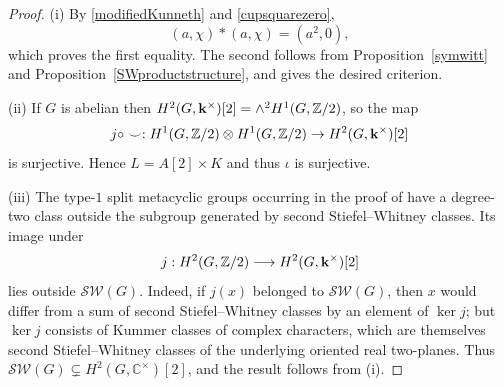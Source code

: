 \documentclass[12pt]{amsart}
\numberwithin{equation}{section}
\providecommand{\k}{}\renewcommand{\k}{\mathbf{k}}
\theoremstyle{plain}
\theoremstyle{definition}
\theoremstyle{remark}
\begin{document}
\begin{proof}
(i) By \eqref{modifiedKunneth} and \eqref{cupsquarezero},
\[
(a,\chi)*(a,\chi)=(a^2,0),
\]
which proves the first equality. The second follows from Proposition~\ref{symwitt} and Proposition~\ref{SWproductstructure}, and gives the desired criterion.

(ii) If $G$ is abelian then $H^2(G,\k^\times)[2]=\wedge^2 H^1(G,\Bbb Z/2)$, so 
the map 
$$
j\circ \smile: H^1(G,\Bbb Z/2)\otimes H^1(G,\Bbb Z/2)\to H^2(G,\k^\times)[2]
$$ 
is surjective. Hence $L=A[2]\times K$ and thus $\iota$ is surjective. 

(iii) The type-$1$ split metacyclic groups occurring in the proof of \cite[Theorem~2, pp.~336--337]{GKT} have a degree-two class outside the subgroup generated by second Stiefel--Whitney classes. Its image under
\[
j:H^2(G,\Bbb Z/2)\longrightarrow H^2(G,\k^\times)[2]
\]
lies outside ${\mathcal S\mathcal W}(G)$. Indeed, if $j(x)$ belonged to ${\mathcal S\mathcal W}(G)$, then $x$ would differ from a sum of second Stiefel--Whitney classes by an element of $\ker j$; but $\ker j$ consists of Kummer classes of complex characters, which are themselves second Stiefel--Whitney classes of the underlying oriented real two-planes. Thus ${\mathcal S\mathcal W}(G)\subsetneq H^2(G,\mathbb C^\times)[2]$, and the result follows from (i).
\end{proof}
\end{document}
